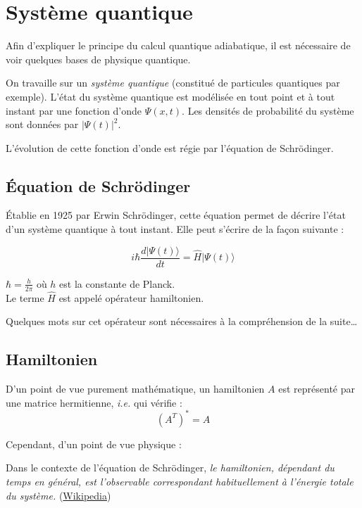 \documentclass{article}
\begin{document}
\section{Système quantique}

Afin d'expliquer le principe du calcul quantique adiabatique, il est nécessaire de voir quelques bases de physique quantique.

\medskip

\noindent On travaille sur un \emph{système quantique} (constitué de particules quantiques par exemple). L'état du système quantique est modélisée en tout point et à tout instant par une fonction d'onde $\Psi(x,t)$. Les densités de probabilité du système sont données par $|\Psi(t)|^2$.

\medskip

\noindent L'évolution de cette fonction d'onde est régie par l'équation de Schrödinger.

\subsection{Équation de Schrödinger}

Établie en 1925 par Erwin Schrödinger, cette équation permet de décrire l'état d'un système quantique à tout instant. Elle peut s'écrire de la façon suivante : 

\begin{equation}
    \label{schro}
    i\hbar\frac{d|\Psi(t) \rangle}{dt} = \hat{H}|\Psi(t)\rangle
\end{equation}

\noindent $\hbar=\frac{h}{2\pi}$ où $h$ est la constante de Planck. \\
\noindent Le terme $\hat{H}$ est appelé opérateur hamiltonien. \cite{wikipedia2023schrodinger}

\medskip

Quelques mots sur cet opérateur sont nécessaires à la compréhension de la suite\dots

\subsection{Hamiltonien}

D'un point de vue purement mathématique, un hamiltonien $A$ est représenté par une matrice hermitienne, \emph{i.e.} qui vérifie : 
$$(A^T)^* = A$$

Cependant, d'un point de vue physique :

\medskip

\noindent Dans le contexte de l'équation de Schrödinger, \textit{le hamiltonien, dépendant du temps en général, est l'observable correspondant habituellement à l'énergie totale du système.} (\href{https://fr.wikipedia.org/wiki/%C3%89quation_de_Schr%C3%B6dinger}{Wikipedia})
\end{document}
